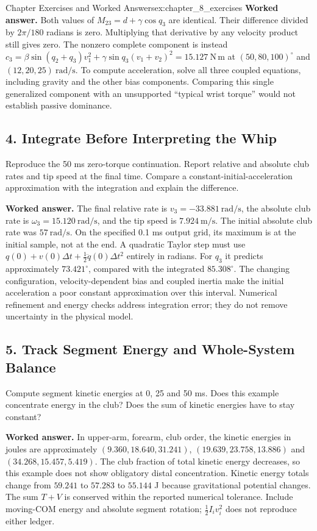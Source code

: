 \begin{exercises}{Chapter Exercises and Worked Answers}{ex:chapter_8_exercises}
\textbf{Worked answer.} Both values of $M_{23}=d+\gamma\cos q_3$ are identical. Their difference divided by $2\pi/180$ radians is zero. Multiplying that derivative by any velocity product still gives zero. The nonzero complete component is instead $c_3=\beta\sin(q_2+q_3)v_1^2+\gamma\sin q_3(v_1+v_2)^2=15.127\ \mathrm{N\,m}$ at $(50,80,100)^\circ$ and $(12,20,25)\ \mathrm{rad/s}$. To compute acceleration, solve all three coupled equations, including gravity and the other bias components. Comparing this single generalized component with an unsupported ``typical wrist torque'' would not establish passive dominance.

\subsection*{4. Integrate Before Interpreting the Whip}
Reproduce the 50 ms zero-torque continuation. Report relative and absolute club rates and tip speed at the final time. Compare a constant-initial-acceleration approximation with the integration and explain the difference.

\textbf{Worked answer.} The final relative rate is $v_3=-33.881\ \mathrm{rad/s}$, the absolute club rate is $\omega_3=15.120\ \mathrm{rad/s}$, and the tip speed is $7.924\ \mathrm{m/s}$. The initial absolute club rate was $57\ \mathrm{rad/s}$. On the specified 0.1 ms output grid, its maximum is at the initial sample, not at the end. A quadratic Taylor step must use $q(0)+v(0)\Delta t+\tfrac12\ddot q(0)\Delta t^2$ entirely in radians. For $q_3$ it predicts approximately $73.421^\circ$, compared with the integrated $85.308^\circ$. The changing configuration, velocity-dependent bias and coupled inertia make the initial acceleration a poor constant approximation over this interval. Numerical refinement and energy checks address integration error; they do not remove uncertainty in the physical model.

\subsection*{5. Track Segment Energy and Whole-System Balance}
Compute segment kinetic energies at 0, 25 and 50 ms. Does this example concentrate energy in the club? Does the sum of kinetic energies have to stay constant?

\textbf{Worked answer.} In upper-arm, forearm, club order, the kinetic energies in joules are approximately $(9.360,18.640,31.241)$, $(19.639,23.758,13.886)$ and $(34.268,15.457,5.419)$. The club fraction of total kinetic energy decreases, so this example does not show obligatory distal concentration. Kinetic energy totals change from $59.241$ to $57.283$ to $55.144$ J because gravitational potential changes. The sum $T+V$ is conserved within the reported numerical tolerance. Include moving-COM energy and absolute segment rotation; $\tfrac12I_i v_i^2$ does not reproduce either ledger.


\end{exercises}
